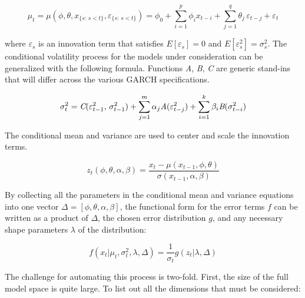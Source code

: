 \documentclass[12pt]{article}
\begin{document}
\begin{equation} \label{eq:conditional_mean}
    \mu_{t} = \mu(\phi, \theta, x_{\{s:\, s < t\}}, \varepsilon_{\{s:\, s < t\}}) = \phi_{0} + \sum_{i=1}^{p} \phi_{i} x_{t-i} + \sum_{j=1}^{q} \theta_{j} \, \varepsilon_{t - j} + \varepsilon_{t}
\end{equation}

where $\varepsilon_{s}$ is an innovation term that satisfies $E[\varepsilon_{s}] = 0$ and $E[\varepsilon^{2}_{s}] = \sigma^{2}_{s}$. The conditional volatility process for the models under consideration can be generalized with the following formula. Functions \emph{A}, \emph{B}, \emph{C} are generic stand-ins that will differ across the various GARCH specifications.

\begin{equation} \label{eq:conditional_var}
    \sigma^{2}_{t} = \emph{C}(\varepsilon^{2}_{t-1}, \, \sigma^{2}_{t-1}) + \sum_{j=1}^{m} \alpha_{j} \emph{A}(\varepsilon^{2}_{t - j}) + \sum_{i=1}^{k} \beta_{i} \emph{B}(\sigma^{2}_{t - i})
\end{equation}

The conditional mean and variance are used to center and scale the innovation terms.

\begin{equation} \label{eq:z_score_returns}
    z_{t}(\phi, \theta, \alpha, \beta) = \frac{x_{t} - \mu(x_{t-1}, \phi, \theta)}{\sigma(x_{t-1}, \alpha, \beta)}
\end{equation}

By collecting all the parameters in the conditional mean and variance equations into one vector $\Delta = [\phi, \theta, \alpha, \beta]$, the functional form for the error terms $f$ can be written as a product of $\Delta$, the chosen error distribution $g$, and any necessary shape parameters $\lambda$ of the distribution:

\begin{equation} \label{eq:conditional_distr}
    f(x_{t} | \mu_{t}, \sigma^{2}_{t}, \lambda, \Delta) = \frac{1}{\sigma_{t}} g(z_{t} | \lambda, \Delta)
\end{equation}

The challenge for automating this process is two-fold. First, the size of the full model space is quite large. To list out all the dimensions that must be considered:
\end{document}
